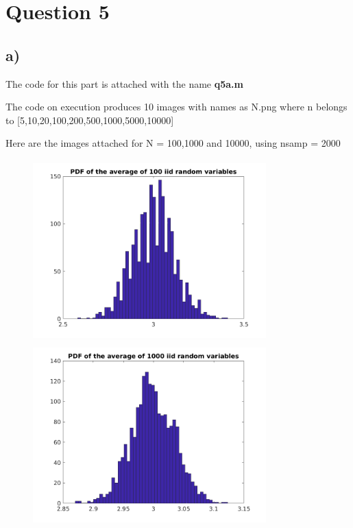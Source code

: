 \documentclass{article}
\begin{document}
\section*{Question 5}
\subsection*{a)}
    The code for this part is attached with the name \textbf{q5a.m}\par 
    The code on execution produces 10 images with names as N.png where n belongs to [5,10,20,100,200,500,1000,5000,10000]\par 
    Here are the images attached for N = 100,1000 and 10000, using nsamp = 2000\par 
    \begin{figure}[H]
    \begin{floatrow}
    {\includegraphics[width =9cm, height=7cm]{100.png}}
    {\includegraphics[width =9cm, height=7cm]{1000.png}}
    \end{floatrow}

\end{figure}
\end{document}
